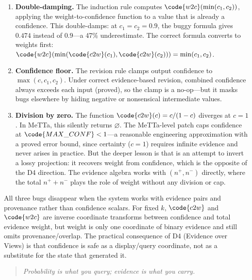 \documentclass[11pt,openany]{report}
\begin{document}
\begin{enumerate}
\item \textbf{Double-damping.}  The induction rule computes
  $\code{w2c}(\min(c_1, c_2))$, applying the
  weight-to-confidence function to a value that is already a
  confidence.  This double-damps: at $c_1 = c_2 = 0.9$, the
  buggy formula gives $0.474$ instead of $0.9$---a 47\%
  underestimate.  The correct formula converts to weights first:
  $\code{w2c}(\min(\code{c2w}(c_1), \code{c2w}(c_2))) =
  \min(c_1, c_2)$.

\item \textbf{Confidence floor.}  The revision rule clamps
  output confidence to $\max(c, c_1, c_2)$.  Under correct
  evidence-based revision, combined confidence always exceeds
  each input (proved), so the clamp is a no-op---but it masks
  bugs elsewhere by hiding negative or nonsensical intermediate
  values.

\item \textbf{Division by zero.}  The function
  $\code{c2w}(c) = c/(1-c)$ diverges at $c = 1$.  In MeTTa,
  this silently returns $\varnothing$.  The MeTTa-level patch
  caps confidence at $\code{MAX\_CONF} < 1$---a reasonable
  engineering approximation with a proved error bound, since
  certainty ($c = 1$) requires infinite evidence and never
  arises in practice.  But the deeper lesson is that
   is an attempt to invert a lossy projection:
  it recovers weight from confidence, which is the opposite
  of the D4 direction.  The evidence algebra works with
  $(n^+, n^-)$ directly, where the total $n^+ + n^-$
  plays the role of weight without any division or cap.
\end{enumerate}

\noindent
All three bugs disappear when the system works with evidence
pairs and provenance rather than confidence scalars.  For fixed $k$,
$\code{c2w}$ and $\code{w2c}$ are inverse coordinate transforms between
confidence and total evidence weight, but weight is only one coordinate
of binary evidence and still omits provenance/overlap.  The practical
consequence of D4 (Evidence over Views) is that confidence is safe as a
display/query coordinate, not as a substitute for the state that
generated it.

\begin{quote}
\emph{Probability is what you query; evidence is what you carry.}
\end{quote}

\end{document}
